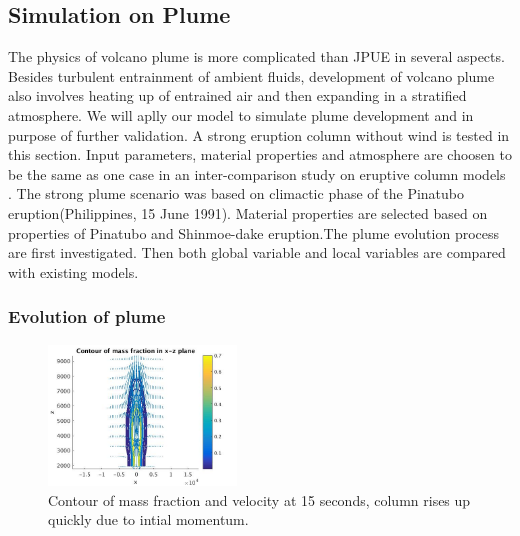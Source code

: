 \documentclass[10pt,a4paper]{article}
\begin{document}
\subsection{Simulation on Plume}
The physics of volcano plume is more complicated than JPUE in several aspects. Besides turbulent entrainment of ambient fluids, development of volcano plume also involves heating up of entrained air and then expanding in a stratified atmosphere. We will aplly our model to simulate plume development and in purpose of further validation. A strong eruption column without wind is tested in this section. Input parameters, material properties and atmosphere are choosen to be the same as one case in an inter-comparison study on eruptive column models \cite{costa2016results}. The strong plume scenario was based on climactic phase of the Pinatubo eruption(Philippines, 15 June 1991). Material properties are selected based on properties of Pinatubo and Shinmoe-dake eruption.The plume evolution process are first investigated. Then both global variable and local variables are compared with existing models. 
\subsubsection{Evolution of plume} 
\begin{figure}
\center
\includegraphics[width=5cm]{t15}
\caption{Contour of mass fraction and velocity at 15 seconds, column rises up quickly due to intial momentum.}
\label{fig:strong_t15}
\end{figure}
\end{document}
